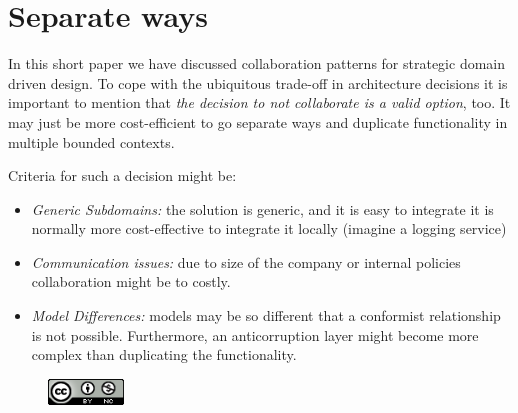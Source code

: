 \documentclass{tufte-handout}
\begin{document}
\section{Separate ways}

In this short paper we have discussed collaboration patterns for strategic domain
driven design. To cope with the ubiquitous trade-off in architecture decisions
it is important to mention that \textit{the decision to not collaborate is a 
valid option}, too. It may just be more cost-efficient to go separate ways and
duplicate functionality in multiple bounded contexts.

Criteria for such a decision might be:

\begin{itemize}
    \item \textit{Generic Subdomains:} the solution is generic, and it is easy to integrate
    it is normally more cost-effective to integrate it locally (imagine a logging 
    service)
    \item \textit{Communication issues:} due to size of the company or internal policies
    collaboration might be to costly.
    \item \textit{Model Differences:} models may be so different that a conformist relationship
    is not possible. Furthermore, an anticorruption layer might become more complex
    than duplicating the functionality.
\end{itemize}






\begin{figure}
    \includegraphics[width=2cm,right]{img/cc-by.png}
\end{figure}
\end{document}

